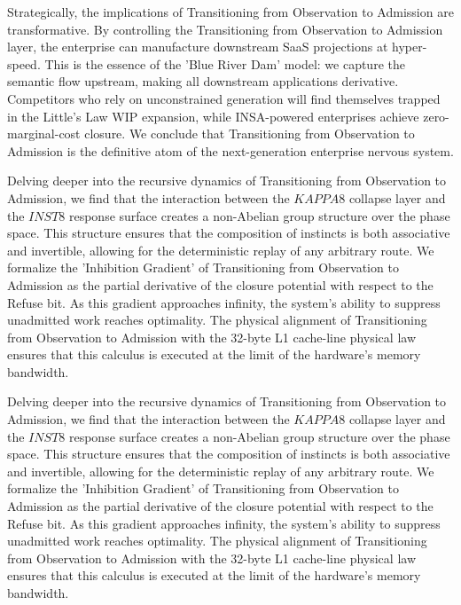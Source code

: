 \documentclass[12pt,a4paper,oneside]{book}
\begin{document}
Strategically, the implications of Transitioning from Observation to Admission are transformative. By controlling the Transitioning from Observation to Admission layer, the enterprise can manufacture downstream SaaS projections at hyper-speed. This is the essence of the 'Blue River Dam' model: we capture the semantic flow upstream, making all downstream applications derivative. Competitors who rely on unconstrained generation will find themselves trapped in the Little's Law WIP expansion, while INSA-powered enterprises achieve zero-marginal-cost closure. We conclude that Transitioning from Observation to Admission is the definitive atom of the next-generation enterprise nervous system. 

Delving deeper into the recursive dynamics of Transitioning from Observation to Admission, we find that the interaction between the $KAPPA8$ collapse layer and the $INST8$ response surface creates a non-Abelian group structure over the phase space. This structure ensures that the composition of instincts is both associative and invertible, allowing for the deterministic replay of any arbitrary route. We formalize the 'Inhibition Gradient' of Transitioning from Observation to Admission as the partial derivative of the closure potential with respect to the Refuse bit. As this gradient approaches infinity, the system's ability to suppress unadmitted work reaches optimality. The physical alignment of Transitioning from Observation to Admission with the 32-byte L1 cache-line physical law ensures that this calculus is executed at the limit of the hardware's memory bandwidth. 

Delving deeper into the recursive dynamics of Transitioning from Observation to Admission, we find that the interaction between the $KAPPA8$ collapse layer and the $INST8$ response surface creates a non-Abelian group structure over the phase space. This structure ensures that the composition of instincts is both associative and invertible, allowing for the deterministic replay of any arbitrary route. We formalize the 'Inhibition Gradient' of Transitioning from Observation to Admission as the partial derivative of the closure potential with respect to the Refuse bit. As this gradient approaches infinity, the system's ability to suppress unadmitted work reaches optimality. The physical alignment of Transitioning from Observation to Admission with the 32-byte L1 cache-line physical law ensures that this calculus is executed at the limit of the hardware's memory bandwidth. 
\end{document}
